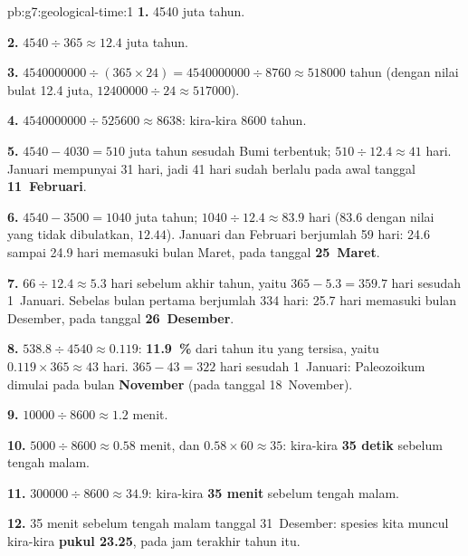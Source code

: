 \begin{solution}{pb:g7:geological-time:1}
\textbf{1.} \num{4540} juta tahun.

\textbf{2.} $4540 \div 365 \approx 12.4$ juta tahun.

\textbf{3.} $\num{4540000000} \div (365 \times 24) = \num{4540000000}
\div 8760 \approx \num{518000}$ tahun (dengan nilai bulat \num{12.4}
juta, $\num{12400000} \div 24 \approx \num{517000}$).

\textbf{4.} $\num{4540000000} \div \num{525600} \approx 8638$: kira-kira
\num{8600} tahun.

\textbf{5.} $4540 - 4030 = 510$ juta tahun sesudah Bumi terbentuk;
$510 \div 12.4 \approx 41$ hari. Januari mempunyai 31 hari, jadi 41 hari
sudah berlalu pada awal tanggal \textbf{11~Februari}.

\textbf{6.} $4540 - 3500 = 1040$ juta tahun; $1040 \div 12.4 \approx
83.9$ hari (83.6 dengan nilai yang tidak dibulatkan, $12.44$). Januari dan
Februari berjumlah 59 hari: 24.6 sampai 24.9 hari memasuki bulan Maret,
pada tanggal \textbf{25~Maret}.

\textbf{7.} $66 \div 12.4 \approx 5.3$ hari sebelum akhir tahun, yaitu
$365 - 5.3 = 359.7$ hari sesudah 1~Januari. Sebelas bulan pertama
berjumlah 334 hari: 25.7 hari memasuki bulan Desember, pada tanggal
\textbf{26~Desember}.

\textbf{8.} $538.8 \div 4540 \approx 0.119$: \textbf{11.9~\%} dari tahun
itu yang tersisa, yaitu $0.119 \times 365 \approx 43$ hari. $365 - 43 =
322$ hari sesudah 1~Januari: Paleozoikum dimulai pada bulan
\textbf{November} (pada tanggal 18~November).

\textbf{9.} $\num{10000} \div 8600 \approx 1.2$ menit.

\textbf{10.} $5000 \div 8600 \approx 0.58$ menit, dan $0.58 \times 60
\approx 35$: kira-kira \textbf{35 detik} sebelum tengah malam.

\textbf{11.} $\num{300000} \div 8600 \approx 34.9$: kira-kira \textbf{35
menit} sebelum tengah malam.

\textbf{12.} 35 menit sebelum tengah malam tanggal 31~Desember: spesies kita
muncul kira-kira \textbf{pukul 23.25}, pada jam terakhir tahun itu.
\end{solution}
